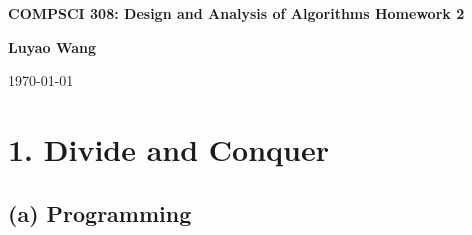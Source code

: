 \documentclass[10pt]{article}
\begin{document}

\begin{center}
  {\Large \bf COMPSCI 308: Design and Analysis of Algorithms Homework 2}
  \vspace{2mm}

  {\bf Luyao Wang}

  {\today}
\end{center}

\section*{1. Divide and Conquer}
\subsection*{(a) Programming}
\end{document}
